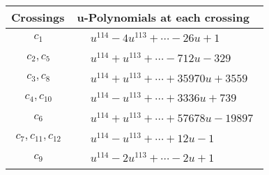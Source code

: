 \documentclass[1p]{elsarticle_modified}
\theoremstyle{definition}
\begin{document}
\begin{tabular}{m{50pt}|m{274pt}}
Crossings & \hspace{64pt}u-Polynomials at each crossing \\
\hline $$\begin{aligned}c_{1}\end{aligned}$$&$\begin{aligned}
&u^{114}-4 u^{113}+\cdots-26 u+1
\end{aligned}$\\
\hline $$\begin{aligned}c_{2},c_{5}\end{aligned}$$&$\begin{aligned}
&u^{114}+u^{113}+\cdots-712 u-329
\end{aligned}$\\
\hline $$\begin{aligned}c_{3},c_{8}\end{aligned}$$&$\begin{aligned}
&u^{114}+u^{113}+\cdots+35970 u+3559
\end{aligned}$\\
\hline $$\begin{aligned}c_{4},c_{10}\end{aligned}$$&$\begin{aligned}
&u^{114}- u^{113}+\cdots+3336 u+739
\end{aligned}$\\
\hline $$\begin{aligned}c_{6}\end{aligned}$$&$\begin{aligned}
&u^{114}+u^{113}+\cdots+57678 u-19897
\end{aligned}$\\
\hline $$\begin{aligned}c_{7},c_{11},c_{12}\end{aligned}$$&$\begin{aligned}
&u^{114}- u^{113}+\cdots+12 u-1
\end{aligned}$\\
\hline $$\begin{aligned}c_{9}\end{aligned}$$&$\begin{aligned}
&u^{114}-2 u^{113}+\cdots-2 u+1
\end{aligned}$\\
\hline
\end{tabular}\\~\\
\newpage\renewcommand{\arraystretch}{1}
\end{document}
